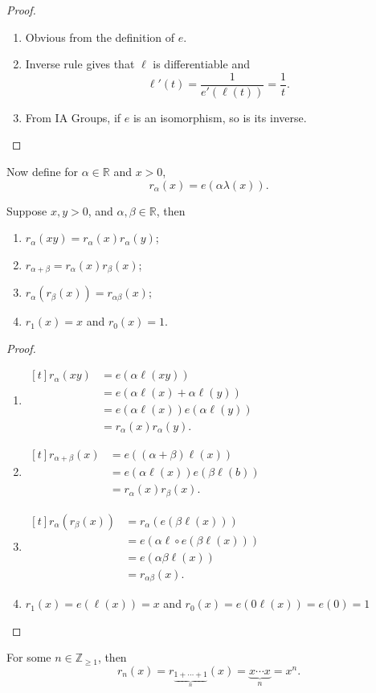 \begin{proof}
    \leavevmode
    \begin{enumerate}
        \item Obvious from the definition of \(e\).
        \item Inverse rule gives that \(\ell\) is differentiable and
        \[
            \ell'(t) = \frac{1}{e'(\ell(t))} = \frac{1}{t}.
        \]
        \item From IA Groups, if \(e\) is an isomorphism, so is its inverse.
    \end{enumerate}
\end{proof}
Now define for \(\alpha \in \mathbb{R}\) and \(x > 0\),
\[
    r_\alpha(x) = e(\alpha \lambda(x)).
\]
\begin{theorem}
    Suppose \(x, y > 0\), and \(\alpha, \beta\in \mathbb{R}\), then
    \begin{enumerate}
        \item \(r_\alpha(xy) = r_\alpha(x)r_\alpha(y)\);
        \item \(r_{\alpha+\beta} = r_\alpha(x)r_\beta(x)\);
        \item \(r_\alpha(r_\beta(x)) = r_{\alpha \beta}(x)\);
        \item \(r_1(x) = x\) and \(r_0(x) = 1\).
    \end{enumerate}
\end{theorem}
\begin{proof}
    \leavevmode
    \begin{enumerate}
        \item \(\begin{aligned}[t]r_\alpha(xy) &= e(\alpha \ell(xy))\\
        &=e(\alpha\ell(x) + \alpha\ell(y))\\
        &=e(\alpha\ell(x))e(\alpha\ell(y))\\
        &=r_\alpha(x)r_\alpha(y).\end{aligned}\)
        \item \(\begin{aligned}[t]
            r_{\alpha+\beta}(x) &= e((\alpha + \beta)\ell(x))\\
            &= e(\alpha\ell(x))e(\beta\ell(b))\\
            &=r_\alpha(x)r_\beta(x).
        \end{aligned}\) 
        \item \(\begin{aligned}[t]
            r_\alpha(r_\beta(x)) &= r_\alpha(e(\beta \ell(x)))\\
            &= e(\alpha \ell \circ e(\beta\ell(x)))\\
            &= e(\alpha \beta \ell(x))\\
            &=r_{\alpha \beta}(x). 
        \end{aligned}\) 
        \item \(r_1(x) = e(\ell(x)) = x\) and \(r_0(x) = e(0 \ell(x)) = e(0) = 1\) 
    \end{enumerate}
\end{proof}
For some \(n \in \mathbb{Z}_{\geq 1}\), then
\[
    r_n(x) = r_{\underbrace{1 + \cdots + 1}_{n}}(x) = \underbrace{x \cdots x}_{n} = x^n.
\]

